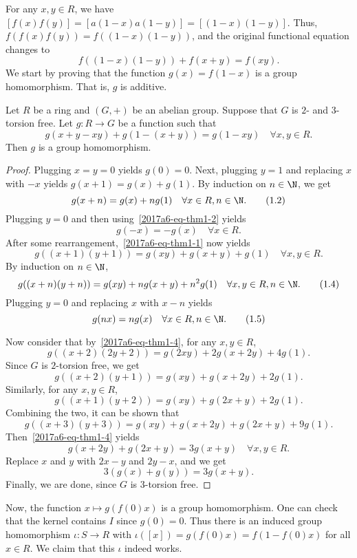 For any $x, y \in R$, we have $[f(x) f(y)] = [a (1 - x) a (1 - y)] = [(1 - x)(1 - y)]$.
Thus, $f(f(x) f(y)) = f((1 - x)(1 - y))$, and the original functional equation changes to
\[ f((1 - x) (1 - y)) + f(x + y) = f(xy). \]
We start by proving that the function $g(x) = f(1 - x)$ is a group homomorphism.
That is, $g$ is additive.

\begin{lemma}\label{2017a6-side-FE-solution}
Let $R$ be a ring and $(G, +)$ be an abelian group.
Suppose that $G$ is $2$- and $3$-torsion free.
Let $g : R \to G$ be a function such that
\[ g(x + y - xy) + g(1 - (x + y)) = g(1 - xy) \quad \forall x, y \in R. \tag{1.1}\label{2017a6-eq-thm1-1} \]
Then $g$ is a group homomorphism.
\end{lemma}
\begin{proof}
Plugging $x = y = 0$ yields $g(0) = 0$.
Next, plugging $y = 1$ and replacing $x$ with $-x$ yields $g(x + 1) = g(x) + g(1)$.
By induction on $n \in \N$, we get
\[ g(x + n) = g(x) + n g(1) \quad \forall x \in R, n \in \N. \tag{1.2}\label{2017a6-eq-thm1-2} \]
Plugging $y = 0$ and then using~\eqref{2017a6-eq-thm1-2} yields
\[ g(-x) = -g(x) \quad \forall x \in R. \tag{1.3}\label{2017a6-eq-thm1-3} \]
After some rearrangement,~\eqref{2017a6-eq-thm1-1} now yields
\[ g((x + 1)(y + 1)) = g(xy) + g(x + y) + g(1) \quad \forall x, y \in R. \]
By induction on $n \in \N$,
\[ g((x + n)(y + n)) = g(xy) + n g(x + y) + n^2 g(1) \quad \forall x, y \in R, n \in \N. \tag{1.4}\label{2017a6-eq-thm1-4} \]
Plugging $y = 0$ and replacing $x$ with $x - n$ yields
\[ g(nx) = n g(x) \quad \forall x \in R, n \in \N. \tag{1.5}\label{2017a6-eq-thm1-5} \]

Now consider that by~\eqref{2017a6-eq-thm1-4}, for any $x, y \in R$,
\[ g((x + 2)(2y + 2)) = g(2xy) + 2 g(x + 2y) + 4 g(1). \]
Since $G$ is $2$-torsion free, we get
\[ g((x + 2)(y + 1)) = g(xy) + g(x + 2y) + 2 g(1). \]
Similarly, for any $x, y \in R$,
\[ g((x + 1)(y + 2)) = g(xy) + g(2x + y) + 2 g(1). \]
Combining the two, it can be shown that
\[ g((x + 3)(y + 3)) = g(xy) + g(x + 2y) + g(2x + y) + 9 g(1). \]
Then~\eqref{2017a6-eq-thm1-4} yields
\[ g(x + 2y) + g(2x + y) = 3 g(x + y) \quad \forall x, y \in R. \]
Replace $x$ and $y$ with $2x - y$ and $2y - x$, and we get
\[ 3 (g(x) + g(y)) = 3 g(x + y). \]
Finally, we are done, since $G$ is $3$-torsion free.
\end{proof}

Now, the function $x \mapsto g(f(0) x)$ is a group homomorphism.
One can check that the kernel contains $I$ since $g(0) = 0$.
Thus there is an induced group homomorphism $\iota : S \to R$ with $\iota([x]) = g(f(0) x) = f(1 - f(0) x)$ for all $x \in R$.
We claim that this $\iota$ indeed works.

